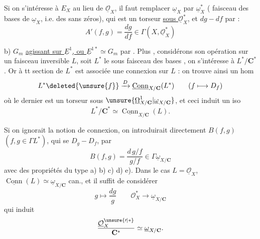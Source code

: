 Si on s'intéresse à $E_X$ au lieu de $\underline{\mathcal O}_X$,
il faut remplacer $\underline\omega_X$ par $\underline\omega_X^*$
( faisceau des bases de $\underline\omega_X$, i.e. des
 sans zéros), qui est un torseur
\uline{sous $\underline{\mathcal O}_X^*$}, et $dg-df$ par
 :
\[
A'(f,g)=\frac{dg}{df}\in\Gamma(X,\underline{\mathcal O}_X^*)
\]

b) $G_m$ \uline{agissant sur $\underline E^1$, ou
$\underline E^{1*}\simeq G_m$} par 
. Plus , considérons
son opération sur un faisceau inversible $L$, soit $L^*$ le sous faisceau
des bases ,
on s'intéresse à $L^*/\mathbf C^*$. Or à tt section de $L^*$ est associée
une connexion sur $L$ : on trouve ainsi un hom
\[
L^*\deleted{\unsure{f}}\xrightarrow{D}
\underline{\operatorname{Conn}}_{X/\mathbf C}(L^*)
\qquad(f\longmapsto D_f)
\]
où le dernier est un torseur sous
$\unsure{\underline\Omega^1_{X/\mathbf C}|\underline\omega_{X/\mathbf C}}$,
et ceci induit un  iso
\[
L^*/\mathbf C^*\simeq\underline{\operatorname{Conn}}_{X/\mathbf C}(L).
\]

Si on ignorait la notion de connexion, on introduirait directement
$B(f,g)$ $(f,g\in\Gamma L^*)$, qui se  $D_g-D_f$, par
\[
B(f,g)=\frac{d\,g/f}{g/f}\in\Gamma\underline\omega_{X/\mathbf C}
\]
avec des propriétés du type a) b) c) d) e). Dans le cas
$L=\underline{\mathcal O}_X$,
$\underline{\operatorname{Conn}}(L)\simeq\underline\omega_{X/\mathbf C}$
can., et il suffit de considérer
\[
g\longmapsto\frac{dg}{g}\qquad
\mathcal O_X^*\longrightarrow\underline\omega_{X/\mathbf C}
\]
qui induit
\[
\frac{\underline{\mathcal O}_X^{\unsure{\prime|*}}}{\mathbf C^*}
\simeq\underline\omega_{X/\mathbf C}.
\]


